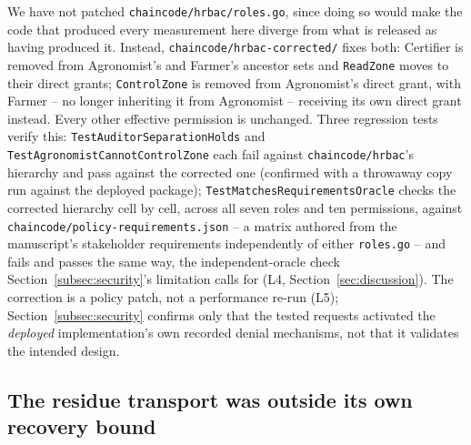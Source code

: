 \documentclass[a4paper,fleqn]{cas-sc}
\begin{document}
We have not patched \texttt{chaincode/hrbac/roles.go}, since doing so
would make the code that produced every measurement here diverge from
what is released as having produced it. Instead,
\texttt{chaincode/hrbac-corrected/} fixes
both: Certifier is removed from Agronomist's and Farmer's ancestor sets
and \texttt{ReadZone} moves to their direct grants; \texttt{ControlZone}
is removed from Agronomist's direct grant, with Farmer -- no longer
inheriting it from Agronomist -- receiving its own direct grant instead.
Every other effective permission is unchanged. Three regression tests
verify this: \texttt{TestAuditorSeparationHolds} and
\texttt{TestAgronomistCannotControlZone} each fail against
\texttt{chaincode/hrbac}'s hierarchy and pass against the corrected one
(confirmed with a throwaway copy run against the deployed package);
\texttt{TestMatchesRequirementsOracle} checks the corrected hierarchy
cell by cell, across all seven roles and ten permissions, against
\texttt{chaincode/policy-requirements.json} -- a matrix authored from the
manuscript's stakeholder requirements independently of either
\texttt{roles.go} -- and fails and passes the same way, the
independent-oracle check Section~\ref{subsec:security}'s limitation calls
for (L4, Section~\ref{sec:discussion}). The correction is a policy patch,
not a performance re-run (L5); Section~\ref{subsec:security} confirms only
that the tested requests activated the \emph{deployed} implementation's
own recorded denial mechanisms, not that it validates the intended
design.

\subsection{The residue transport was outside its own recovery bound}
\label{subsec:pm_crt}
\end{document}
